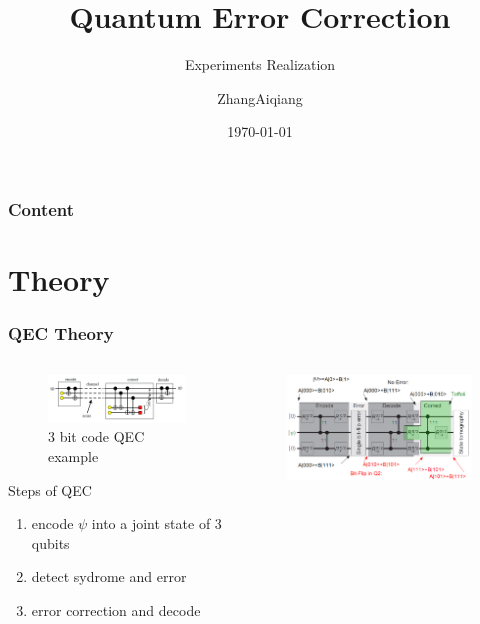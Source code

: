 \documentclass[aspectratio=169,10pt]{beamer}
\title{Quantum Error Correction}
\subtitle{Experiments Realization}
\author{ZhangAiqiang}
\institute{Tsinghua University}
\date{\today}
\begin{document}
\begin{frame}[noframenumbering]
    \titlepage
\end{frame}
\begin{frame}[noframenumbering]
    \frametitle{Content}
    \tableofcontents
\end{frame}
\section{Theory}
\begin{frame}
    \frametitle{QEC Theory}
    \begin{columns}
        \begin{column}{0.5\textwidth}
            \begin{figure}
                \includegraphics[width=\columnwidth]{figure/3bit.png}
                \caption{3 bit code QEC example}
            \end{figure}
            \begin{block}{Steps of QEC}
                \begin{enumerate}
                    \item encode $\psi$ into a joint state of 3 qubits
                    \item detect sydrome and error
                    \item error correction and decode
                \end{enumerate}
            \end{block}
        \end{column}
        \begin{column}{0.5\textwidth}
        \begin{figure}
            \includegraphics[width=0.9\columnwidth]{figure/toffoli.png}

\end{figure}
\end{column}
\end{columns}
\end{frame}
\end{document}
